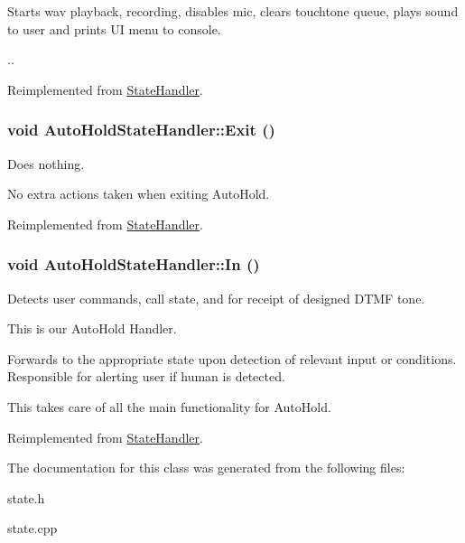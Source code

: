 Starts wav playback, recording, disables mic, clears touchtone queue, plays sound to user and prints UI menu to console. 

.. 

Reimplemented from \hyperlink{classStateHandler_c08036e743cf5172d6931cf3b6d321c6}{StateHandler}.\hypertarget{classAutoHoldStateHandler_c601de6921ba53a17531dea0d00f493b}{
\subsubsection[{Exit}]{\setlength{\rightskip}{0pt plus 5cm}void AutoHoldStateHandler::Exit ()}}
\label{classAutoHoldStateHandler_c601de6921ba53a17531dea0d00f493b}


Does nothing. 

No extra actions taken when exiting AutoHold.

Reimplemented from \hyperlink{classStateHandler_5ce0f2cb3d4a9f5aca137d47eac75c1e}{StateHandler}.\hypertarget{classAutoHoldStateHandler_ae7396add19df1c6e3199cfb533df040}{
\subsubsection[{In}]{\setlength{\rightskip}{0pt plus 5cm}void AutoHoldStateHandler::In ()}}
\label{classAutoHoldStateHandler_ae7396add19df1c6e3199cfb533df040}


Detects user commands, call state, and for receipt of designed DTMF tone. 

This is our AutoHold Handler.

Forwards to the appropriate state upon detection of relevant input or conditions. Responsible for alerting user if human is detected.

This takes care of all the main functionality for AutoHold. 

Reimplemented from \hyperlink{classStateHandler_cee16f855e7354d21abafa47acd1046c}{StateHandler}.

The documentation for this class was generated from the following files:\begin{CompactItemize}
\item 
state.h\item 
state.cpp\end{CompactItemize}
